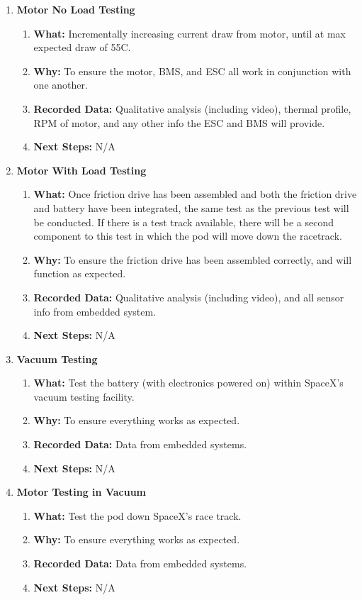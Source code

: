 \documentclass[main.tex]{subfiles}
\begin{document}
    \begin{enumerate}
        \item \textbf{Motor No Load Testing}
        \begin{enumerate}
            \item \textbf{What: }Incrementally increasing current draw from motor, until at max expected draw of 55C.
            \item \textbf{Why: }To ensure the motor, BMS, and ESC all work in conjunction with one another.
            \item \textbf{Recorded Data: }Qualitative analysis (including video), thermal profile, RPM of motor, and any other info the ESC and BMS will provide.
            \item \textbf{Next Steps: }N/A
        \end{enumerate}
        \item \textbf{Motor With Load Testing}
        \begin{enumerate}
            \item \textbf{What: }Once friction drive has been assembled and both the friction drive and battery have been integrated, the same test as the previous test will be conducted. If there is a test track available, there will be a second component to this test in which the pod will move down the racetrack.
            \item \textbf{Why: }To ensure the friction drive has been assembled correctly, and will function as expected.
            \item \textbf{Recorded Data: }Qualitative analysis (including video), and all sensor info from embedded system.
            \item \textbf{Next Steps: }N/A
        \end{enumerate}
        \item \textbf{Vacuum Testing}
        \begin{enumerate}
            \item \textbf{What: }Test the battery (with electronics powered on) within SpaceX’s vacuum testing facility.
            \item \textbf{Why: }To ensure everything works as expected.
            \item \textbf{Recorded Data: }Data from embedded systems.
            \item \textbf{Next Steps: }N/A
        \end{enumerate}
        \item \textbf{Motor Testing in Vacuum}
        \begin{enumerate}
            \item \textbf{What: }Test the pod down SpaceX’s race track.
            \item \textbf{Why: }To ensure everything works as expected.
            \item \textbf{Recorded Data: }Data from embedded systems.
            \item \textbf{Next Steps: }N/A
        \end{enumerate}
    \end{enumerate}
\end{document}
